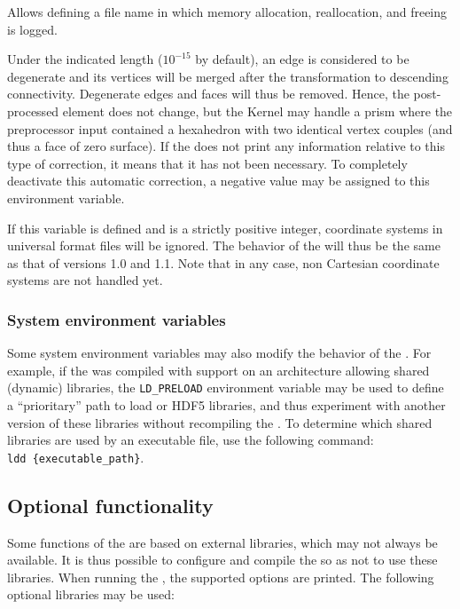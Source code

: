 {{{Allows defining a file name in which memory allocation, reallocation,
and freeing is logged.


Under the indicated length ($10^{-15}$ by default), an edge is considered
to be degenerate and its vertices will be merged after the transformation
to descending connectivity. Degenerate edges and faces will thus be
removed. Hence, the post-processed element does not change, but the
Kernel may handle a prism where the preprocessor input contained a
hexahedron with two identical vertex couples (and thus a face of zero
surface). If the \pcs does not print any information relative to this
type of correction, it means that it has not been necessary. To completely
deactivate this automatic correction, a negative value may be assigned
to this environment variable.


If this variable is defined and is a strictly positive integer, coordinate
systems in \ideas universal format files will be ignored. The behavior
of the \pcs will thus be the same as that of versions 1.0 and 1.1.
Note that in any case, non Cartesian coordinate systems are not handled yet.

\subsubsection{System environment variables\label{sec:envpcs:sys}}

Some system environment variables may also modify the behavior of
the \pcs. For example, if the \pcs was compiled with \med support
on an architecture allowing shared (dynamic) libraries, the
\texttt {LD\_PRELOAD} environment variable may be used to define a
``prioritary'' path to load \med or HDF5 libraries, and thus experiment
with another version of these libraries without recompiling the \pcs.
To determine which shared libraries are used by an executable file, use
the following command: \texttt{ldd~\{executable\_path\}}.

\subsection{Optional functionality\label{sec:pcs:lib_opt}}

Some functions of the \pcs are based on external libraries,
which may not always be available. It is thus possible to configure
and compile the \pcs so as not to use these libraries.
When running the \pcs, the supported options are printed.
The following optional libraries may be used:

}}}
